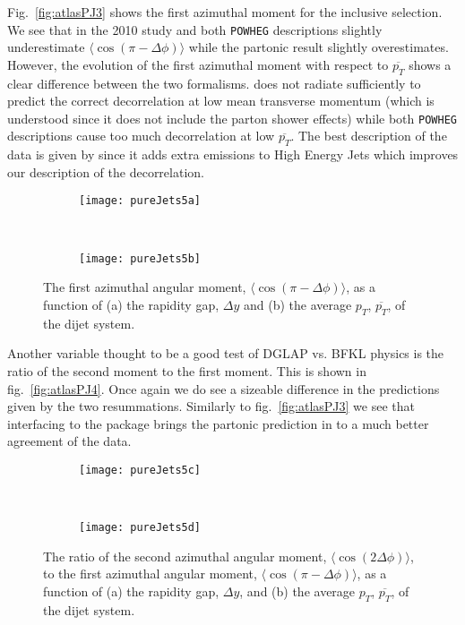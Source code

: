 	Fig.~\eqref{fig:atlasPJ3} shows the first azimuthal moment for the inclusive selection.
	We see that in the 2010 study \HEJA and both \texttt{POWHEG} descriptions slightly
	underestimate $\langle\cos(\pi-\Delta\phi)\rangle$ while the partonic \HEJ result slightly
	overestimates.  However, the evolution of the first azimuthal moment with respect to
	$\overline{p_T}$ shows a clear difference between the two formalisms.  \HEJ does not
	radiate sufficiently to predict the correct decorrelation at low mean transverse momentum
	(which is understood since it does not include the parton shower effects) while both
	\texttt{POWHEG} descriptions cause too much decorrelation at low $\overline{p_T}$.
	The best description of the data is given by \HEJA since it adds extra emissions to High
	Energy Jets which improves our description of the decorrelation.

	\begin{figure}[bth]
		\centering
		\begin{subfigure}[b]{0.48\textwidth}
			\texttt{[image: pureJets5a]}
			\caption{}
			\label{fig:}
		\end{subfigure}
		~
		\begin{subfigure}[b]{0.48\textwidth}
			\texttt{[image: pureJets5b]}
			\caption{}
			\label{fig:}
		\end{subfigure}
		\caption{The first azimuthal angular moment, $\langle \cos(\pi-\Delta\phi)\rangle$,
		as a function of (a) the rapidity gap, $\Delta y$ and (b) the average $p_T$,
		$\overline{p_T}$, of the dijet system.}
		\label{fig:atlasPJ3}
	\end{figure}

	Another variable thought to be a good test of DGLAP vs. BFKL physics is the ratio of
	the second moment to the first moment.  This is shown in fig.~\eqref{fig:atlasPJ4}.  Once
	again we do see a sizeable difference in the predictions given by the two resummations.
	Similarly to fig.~\eqref{fig:atlasPJ3} we see that interfacing to the \ARIADNE package
	brings the partonic \HEJ prediction in to a much better agreement of the data.

	\begin{figure}[bth]
		\begin{subfigure}[b]{0.48\textwidth}
			\texttt{[image: pureJets5c]}
			\caption{}
			\label{fig:}
		\end{subfigure}
		~
		\begin{subfigure}[b]{0.48\textwidth}
			\texttt{[image: pureJets5d]}
			\caption{}
			\label{fig:}
		\end{subfigure}
		\caption{The ratio of the second azimuthal angular moment, $\langle \cos(2\Delta\phi)\rangle$,
		to the first azimuthal angular moment, $\langle \cos(\pi-\Delta\phi)\rangle$, as a function of
		(a) the rapidity gap, $\Delta y$, and (b) the average $p_T$, $\overline{p_T}$, of the dijet system.}
		\label{fig:atlasPJ4}
	\end{figure}


